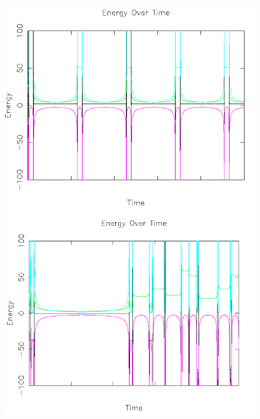 \documentclass{article}
\begin{document}
\begin{center}
    \includegraphics[scale=0.5]{charged_2_opp_energy_no_collision}
    \includegraphics[scale=0.5]{charged_2_opp_energy_no_collision_half_time}
\end{center}
\end{document}
